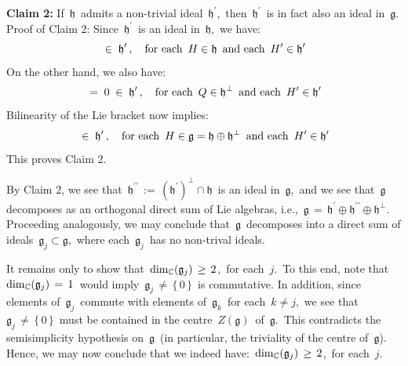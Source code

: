 \vskip 0.3cm
\noindent
\textbf{Claim 2:}\;\;
If \,$\mathfrak{h}$\, admits a non-trivial ideal \,$\mathfrak{h}^{\prime}$,\,
then \,$\mathfrak{h}^{\prime}$\, is in fact also an ideal in \,$\mathfrak{g}$.\,
\vskip 0.05cm
\noindent
Proof of Claim 2:\;\;
Since \,$\mathfrak{h}^{\prime}$\, is an ideal in \,$\mathfrak{h}$,\, we have:
\begin{equation*}
[H,H^{\prime}]
\; \in \;
    \mathfrak{h}^{\prime}\,,
\quad
\textnormal{for each \,$H \in \mathfrak{h}$\, and each \,$H^{\prime} \in \mathfrak{h}^{\prime}$}
\end{equation*}
On the other hand, we also have:
\begin{equation*}
[Q,H^{\prime}]
\; = \;
    0
\; \in \;
    \mathfrak{h}^{\prime}\,,
\quad
\textnormal{for each \,$Q \in \mathfrak{h}^{\perp}$\, and each \,$H^{\prime} \in \mathfrak{h}^{\prime}$}
\end{equation*}
Bilinearity of the Lie bracket now implies:
\begin{equation*}
[H,H^{\prime}]
\; \in \;
    \mathfrak{h}^{\prime}\,,
\quad
\textnormal{for each \,$H \in \mathfrak{g} = \mathfrak{h} \oplus \mathfrak{h}^{\perp}$\, and each \,$H^{\prime} \in \mathfrak{h}^{\prime}$}
\end{equation*}
This proves Claim 2.

\vskip 0.3cm
\noindent
By Claim 2, we see that
\,$\mathfrak{h}^{\prime\prime} \,:=\, \left(\mathfrak{h}^{\prime}\right)^{\perp} \cap \mathfrak{h}$\,
is an ideal in \,$\mathfrak{g}$,\, and we see that \,$\mathfrak{g}$\,
decomposes as an orthogonal direct sum of Lie algebras, i.e.,
\,$\mathfrak{g} \,=\, \mathfrak{h}^{\prime} \oplus \mathfrak{h}^{\prime\prime} \oplus \mathfrak{h}^{\perp}$.\,
Proceeding analogously, we may conclude that
\,$\mathfrak{g}$\, decomposes into a direct sum of ideals \,$\mathfrak{g}_{j} \subset \mathfrak{g}$,\,
where each \,$\mathfrak{g}_{j}$\, has no non-trival ideals.

\vskip 0.3cm
\noindent
It remains only to show that
\,$\dim_{\mathbb{C}}(\mathfrak{g}_{j}) \,\geq\, 2$,\, for each \,$j$.\,
To this end, note that
\,$\dim_{\mathbb{C}}(\mathfrak{g}_{j}) \,=\, 1$\,
would imply
\,$\mathfrak{g}_{j} \,\neq\, \{\,0\,\}$\, is commutative.
In addition, since elements of \,$\mathfrak{g}_{j}$\,
commute with elements of \,$\mathfrak{g}_{k}$\,
for each \,$k \neq j$,\, we see that
\,$\mathfrak{g}_{j} \,\neq\, \{\,0\,\}$\, must be contained in the centre
\,$Z(\mathfrak{g})$\, of \,$\mathfrak{g}$.\,
This contradicts the semisimplicity hypothesis on \,$\mathfrak{g}$\,
(in particular, the triviality of the centre of \,$\mathfrak{g}$).
Hence, we may now conclude that we indeed have:
\,$\dim_{\mathbb{C}}(\mathfrak{g}_{j}) \,\geq\, 2$,\, for each \,$j$.\,

